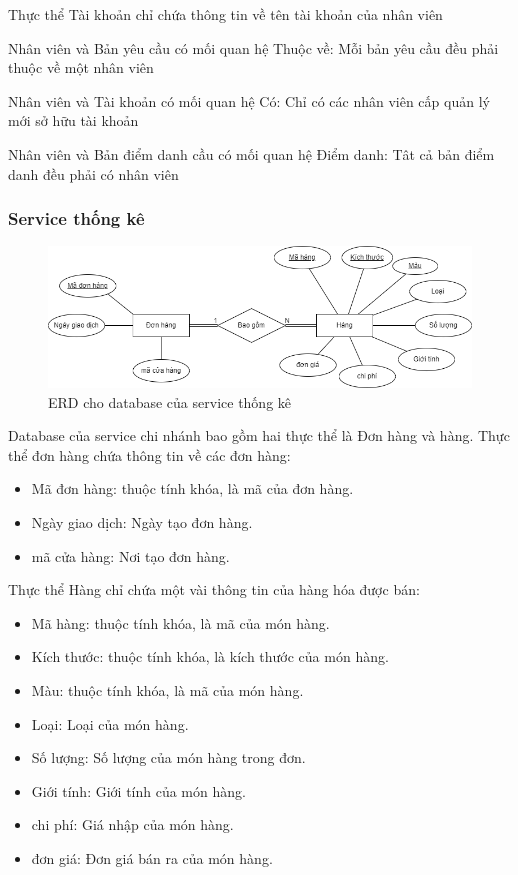 Thực thể Tài khoản chỉ chứa thông tin về tên tài khoản của nhân viên

Nhân viên và Bản yêu cầu có mối quan hệ Thuộc về: Mỗi bản yêu cầu đều phải thuộc về một nhân viên

Nhân viên và Tài khoản có mối quan hệ Có: Chỉ có các nhân viên cấp quản lý mới sở hữu tài khoản

Nhân viên và Bản điểm danh cầu có mối quan hệ Điểm danh: Tât cả bản điểm danh đều phải có nhân viên


\subsubsection{Service thống kê}
\begin{figure}[!htp]
    \begin{center}
        \includegraphics[width=1\textwidth]{img/database/erd/Statistic.png}
        \newline
        \caption{ERD cho database của service thống kê}
    \end{center}
\end{figure}

Database của service chi nhánh bao gồm hai thực thể là Đơn hàng và hàng. Thực thể đơn hàng chứa thông tin về các đơn hàng:
\begin{itemize}
    \item Mã đơn hàng: thuộc tính khóa, là mã của đơn hàng.
    \item Ngày giao dịch: Ngày tạo đơn hàng.
    \item mã cửa hàng: Nơi tạo đơn hàng.
\end{itemize}

Thực thể Hàng chỉ chứa một vài thông tin của hàng hóa được bán:
\begin{itemize}
    \item Mã hàng: thuộc tính khóa, là mã của món hàng.
    \item Kích thước: thuộc tính khóa, là kích thước của món hàng.
    \item Màu: thuộc tính khóa, là mã của món hàng.
    \item Loại: Loại của món hàng.
    \item Số lượng: Số lượng của món hàng trong đơn.
    \item Giới tính: Giới tính của món hàng.
    \item chi phí: Giá nhập của món hàng.
    \item đơn giá: Đơn giá bán ra của món hàng.
\end{itemize}

